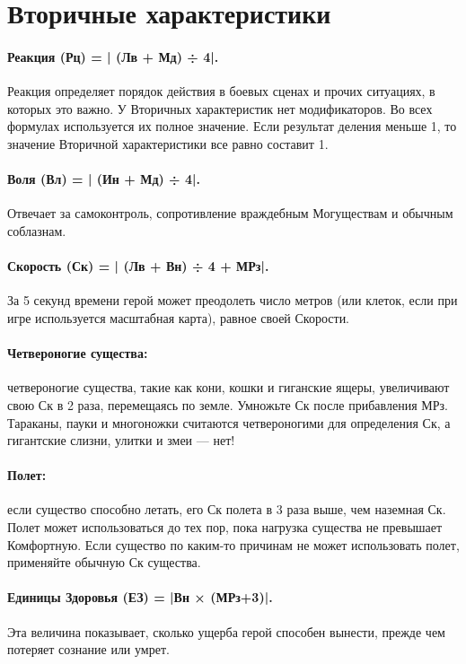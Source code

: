 %

\section{Вторичные характеристики}
\paragraph{Реакция (Рц) = | (Лв + Мд) ÷ 4|.} Реакция определяет порядок действия в боевых сценах и прочих ситуациях, в которых это важно. У Вторичных характеристик нет модификаторов. Во всех формулах используется их полное значение. Если результат деления меньше 1, то значение Вторичной характеристики все равно составит 1.
\paragraph{Воля (Вл) = | (Ин + Мд) ÷ 4|.} Отвечает за самоконтроль, сопротивление враждебным Могуществам и обычным соблазнам.
\paragraph{Скорость (Ск) = | (Лв + Вн) ÷ 4 + МРз|.} За 5 секунд времени герой может преодолеть число метров (или клеток, если при игре используется масштабная карта), равное своей Скорости.
\paragraph{Четвероногие существа:} четвероногие существа, такие как кони, кошки и гиганские ящеры, увеличивают свою Ск в 2 раза, перемещаясь по земле. Умножьте Ск после прибавления МРз. Тараканы, пауки и многоножки считаются четвероногими для определения Ск, а гигантские слизни, улитки и змеи — нет!
\paragraph{Полет:} если существо способно летать, его Ск полета в 3 раза выше, чем наземная Ск. Полет может использоваться до тех пор, пока нагрузка существа не превышает Комфортную. Если существо по каким-то причинам не может использовать полет, применяйте обычную Ск существа.
\paragraph{Единицы Здоровья (ЕЗ) = |Вн × (МРз+3)|.} Эта величина показывает, сколько ущерба герой способен вынести, прежде чем потеряет сознание или умрет.
